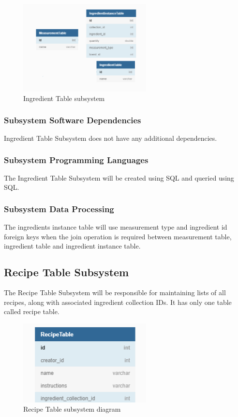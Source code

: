 \begin{figure}[h!]
	\centering
 	\includegraphics[width=0.60\textwidth]{images/Ingredient_SubSystempng.png}
 \caption{Ingredient Table subsystem}
\end{figure}

\subsubsection{Subsystem Software Dependencies}
Ingredient Table Subsystem does not have any additional dependencies.

\subsubsection{Subsystem Programming Languages}
The Ingredient Table Subsystem will be created using SQL and queried using SQL.

\subsubsection{Subsystem Data Processing}
The ingredients instance table will use measurement type and ingredient id foreign keys when the join operation is required between measurement table, ingredient table and ingredient instance table.

\subsection{Recipe Table Subsystem}
The Recipe Table Subsystem will be responsible for maintaining lists of all recipes, along with associated ingredient collection IDs. It has only one table called recipe table.

\begin{figure}[h!]
	\centering
 	\includegraphics[width=0.60\textwidth]{images/Recepice_Subsystem.png}
 \caption{Recipe Table subsystem diagram}
\end{figure}

